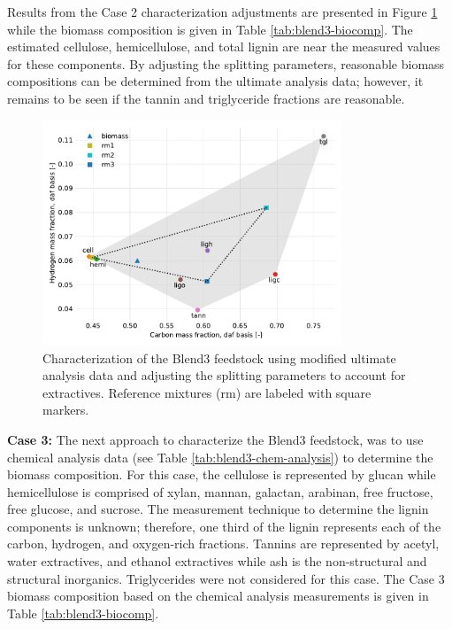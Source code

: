 Results from the Case 2 characterization adjustments are presented in Figure \ref{fig:blend3-biocharact-ultmod} while the biomass composition is given in Table \ref{tab:blend3-biocomp}. The estimated cellulose, hemicellulose, and total lignin are near the measured values for these components. By adjusting the splitting parameters, reasonable biomass compositions can be determined from the ultimate analysis data; however, it remains to be seen if the tannin and triglyceride fractions are reasonable.

\begin{figure}[H]
    \centering
    \includegraphics[width=0.8\textwidth]{figures/blend3-biocharact-ultmod.pdf}
    \caption{Characterization of the Blend3 feedstock using modified ultimate analysis data and adjusting the splitting parameters to account for extractives. Reference mixtures (rm) are labeled with square markers.}
    \label{fig:blend3-biocharact-ultmod}
\end{figure}

\textbf{Case 3:} The next approach to characterize the Blend3 feedstock, was to use chemical analysis data (see Table \ref{tab:blend3-chem-analysis}) to determine the biomass composition. For this case, the cellulose is represented by glucan while hemicellulose is comprised of xylan, mannan, galactan, arabinan, free fructose, free glucose, and sucrose. The measurement technique to determine the lignin components is unknown; therefore, one third of the lignin represents each of the carbon, hydrogen, and oxygen-rich fractions. Tannins are represented by acetyl, water extractives, and ethanol extractives while ash is the non-structural and structural inorganics. Triglycerides were not considered for this case. The Case 3 biomass composition based on the chemical analysis measurements is given in Table \ref{tab:blend3-biocomp}.

